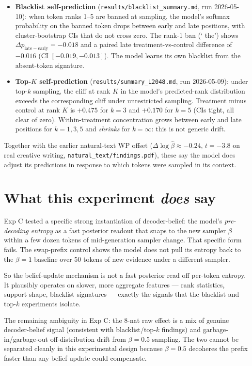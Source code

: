 \documentclass[11pt]{article}
\begin{document}
\begin{itemize}
\item \textbf{Blacklist self-prediction}
(\texttt{results/blacklist\_summary.md}, run 2026-05-10): when token
ranks 1--5 are banned at sampling, the model's softmax probability on the
banned token drops between early and late positions, with cluster-bootstrap
CIs that do not cross zero. The rank-1 ban (` the') shows
$\Delta p_{\mathrm{late}-\mathrm{early}} = -0.018$ and a paired late
treatment-vs-control difference of $-0.016$ (CI $[-0.019, -0.013]$). The
model learns its own blacklist from the absent-token signature.
\item \textbf{Top-$K$ self-prediction}
(\texttt{results/summary\_L2048.md}, run 2026-05-09): under top-$k$
sampling, the cliff at rank $K$ in the model's predicted-rank distribution
exceeds the corresponding cliff under unrestricted sampling.  Treatment
minus control at rank $K$ is $+0.475$ for $k=3$ and $+0.170$ for $k=5$
(CIs tight, all clear of zero).  Within-treatment concentration grows
between early and late positions for $k=1, 3, 5$ and \emph{shrinks} for
$k=\infty$: this is not generic drift.
\end{itemize}

Together with the earlier natural-text WP offset
($\Delta\log\hat\beta \approx -0.24$, $t = -3.8$ on real creative writing,
\texttt{natural\_text/findings.pdf}), these say the model does adjust its
predictions in response to which tokens were sampled in its context.

\section{What this experiment \emph{does} say}

Exp C tested a specific strong instantiation of decoder-belief: the
model's \emph{pre-decoding entropy} as a fast posterior readout that snaps
to the new sampler $\beta$ within a few dozen tokens of mid-generation
sampler change.  That specific form fails.  The swap-prefix control shows
the model does not pull its entropy back to the $\beta=1$ baseline over
50 tokens of new evidence under a different sampler.

So the belief-update mechanism is not a fast posterior read off
per-token entropy.  It plausibly operates on slower, more aggregate
features --- rank statistics, support shape, blacklist signatures ---
exactly the signals that the blacklist and top-$k$ experiments isolate.

The remaining ambiguity in Exp C: the 8-nat raw effect is a mix of
genuine decoder-belief signal (consistent with blacklist/top-$k$ findings)
and garbage-in/garbage-out off-distribution drift from $\beta=0.5$
sampling.  The two cannot be separated cleanly in this experimental
design because $\beta=0.5$ decoheres the prefix faster than any belief
update could compensate.
\end{document}
